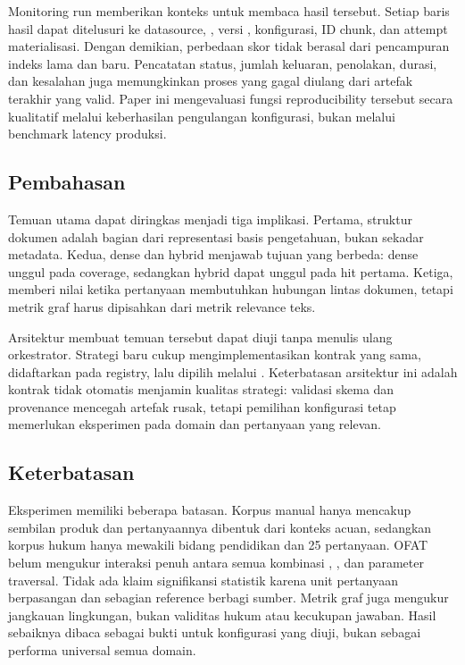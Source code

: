 Monitoring run memberikan konteks untuk membaca hasil tersebut. Setiap baris hasil dapat ditelusuri ke datasource, \profile{}, versi \plugin{}, konfigurasi, ID chunk, dan attempt materialisasi. Dengan demikian, perbedaan skor tidak berasal dari pencampuran indeks lama dan baru. Pencatatan status, jumlah keluaran, penolakan, durasi, dan kesalahan juga memungkinkan proses yang gagal diulang dari artefak terakhir yang valid. Paper ini mengevaluasi fungsi reproducibility tersebut secara kualitatif melalui keberhasilan pengulangan konfigurasi, bukan melalui benchmark latency produksi.

\subsection{Pembahasan}

Temuan utama dapat diringkas menjadi tiga implikasi. Pertama, struktur dokumen adalah bagian dari representasi basis pengetahuan, bukan sekadar metadata. Kedua, dense dan hybrid menjawab tujuan yang berbeda: dense unggul pada coverage, sedangkan hybrid dapat unggul pada hit pertama. Ketiga, \kg{} memberi nilai ketika pertanyaan membutuhkan hubungan lintas dokumen, tetapi metrik graf harus dipisahkan dari metrik relevance teks.

Arsitektur \plugin{} membuat temuan tersebut dapat diuji tanpa menulis ulang orkestrator. Strategi baru cukup mengimplementasikan kontrak yang sama, didaftarkan pada registry, lalu dipilih melalui \profile{}. Keterbatasan arsitektur ini adalah kontrak tidak otomatis menjamin kualitas strategi: validasi skema dan provenance mencegah artefak rusak, tetapi pemilihan konfigurasi tetap memerlukan eksperimen pada domain dan pertanyaan yang relevan.

\subsection{Keterbatasan}

Eksperimen memiliki beberapa batasan. Korpus manual hanya mencakup sembilan produk dan pertanyaannya dibentuk dari konteks acuan, sedangkan korpus hukum hanya mewakili bidang pendidikan dan 25 pertanyaan. OFAT belum mengukur interaksi penuh antara semua kombinasi \chunker{}, \indexer{}, dan parameter traversal. Tidak ada klaim signifikansi statistik karena unit pertanyaan berpasangan dan sebagian reference berbagi sumber. Metrik graf juga mengukur jangkauan lingkungan, bukan validitas hukum atau kecukupan jawaban. Hasil sebaiknya dibaca sebagai bukti untuk konfigurasi yang diuji, bukan sebagai performa universal semua domain.

